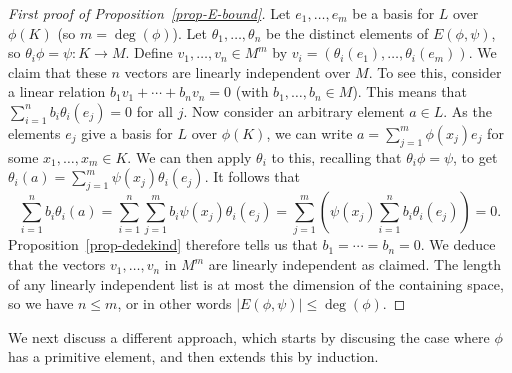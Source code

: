 \documentclass{amsart}
\newcommand{\tht}       {\theta}
\renewcommand{\:}{\colon}
\theoremstyle{definition}
\begin{document}
\begin{proof}[First proof of Proposition~\ref{prop-E-bound}]
 Let $e_1,\dotsc,e_m$ be a basis for $L$ over $\phi(K)$ (so
 $m=\deg(\phi)$).  Let $\tht_1,\dotsc,\tht_n$ be the distinct elements
 of $E(\phi,\psi)$, so $\tht_i\phi=\psi\:K\to M$.  Define
 $v_1,\dotsc,v_n\in M^m$ by $v_i=(\tht_i(e_1),\dotsc,\tht_i(e_m))$.
 We claim that these $n$ vectors are linearly independent over $M$.
 To see this, consider a linear relation $b_1v_1+\dotsb+b_nv_n=0$
 (with $b_1,\dotsc,b_n\in M$).  This means that
 $\sum_{i=1}^nb_i\tht_i(e_j)=0$ for all $j$.  Now consider an
 arbitrary element $a\in L$.  As the elements $e_j$ give a basis for
 $L$ over $\phi(K)$, we can write $a=\sum_{j=1}^m\phi(x_j)e_j$ for
 some $x_1,\dotsc,x_m\in K$.  We can then apply $\tht_i$ to this,
 recalling that $\tht_i\phi=\psi$, to get
 $\tht_i(a)=\sum_{j=1}^m\psi(x_j)\tht_i(e_j)$.  It follows that 
 \[ \sum_{i=1}^n b_i\tht_i(a) = 
    \sum_{i=1}^n\sum_{j=1}^m b_i\psi(x_j)\tht_i(e_j) =
    \sum_{j=1}^m\left(\psi(x_j)\sum_{i=1}^n b_i\tht_i(e_j)\right)
      = 0.
 \]
 Proposition~\ref{prop-dedekind} therefore tells us that
 $b_1=\dotsb=b_n=0$.  We deduce that the vectors $v_1,\dotsc,v_n$ in
 $M^m$ are linearly independent as claimed.  The length of any
 linearly independent list is at most the dimension of the containing
 space, so we have $n\leq m$, or in other words
 $|E(\phi,\psi)|\leq\deg(\phi)$.  
\end{proof}

We next discuss a different approach, which starts by discusing the
case where $\phi$ has a primitive element, and then extends this by
induction.  
\end{document}
